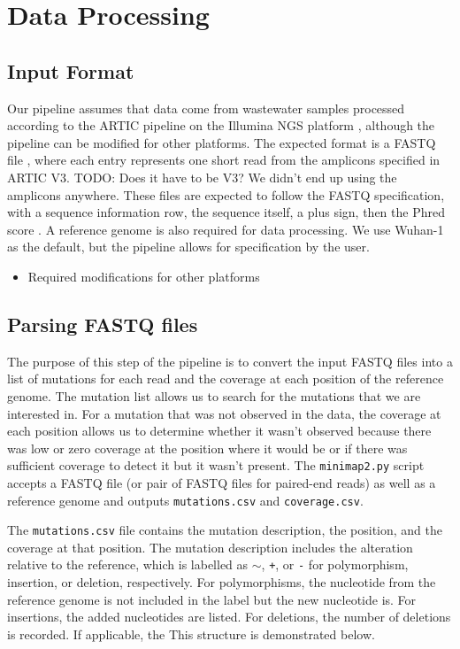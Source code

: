 \documentclass{article}
\newenvironment{tightemize}
{ \begin{itemize}
    \setlength{\itemsep}{0pt}
    \setlength{\parskip}{0pt}
    \setlength{\parsep}{0pt}     }
{ \end{itemize}                  }
\begin{document}
\section{Data Processing}

\subsection{Input Format}

Our pipeline assumes that data come from wastewater samples processed according to the ARTIC pipeline \cite{needed} on the Illumina NGS platform \cite{needed}, although the pipeline can be modified for other platforms.
The expected format is a FASTQ file \cite{needed}, where each entry represents one short read from the amplicons specified in ARTIC V3. TODO: Does it have to be V3? We didn't end up using the amplicons anywhere.
These files are expected to follow the FASTQ specification, with a sequence information row, the sequence itself, a plus sign, then the Phred score \cite{needed}.
A reference genome is also required for data processing.
We use Wuhan-1 \cite{needed} as the default, but the pipeline allows for specification by the user.



\begin{tightemize} 
    \item Required modifications for other platforms
\end{tightemize}

\subsection{Parsing FASTQ files}

The purpose of this step of the pipeline is to convert the input FASTQ files into a list of mutations for each read and the coverage at each position of the reference genome.
The mutation list allows us to search for the mutations that we are interested in.
For a mutation that was not observed in the data, the coverage at each position allows us to determine whether it wasn't observed because there was low or zero coverage at the position where it would be or if there was sufficient coverage to detect it but it wasn't present.
The \texttt{minimap2.py} script accepts a FASTQ file (or pair of FASTQ files for paired-end reads) as well as a reference genome and outputs \texttt{mutations.csv} and \texttt{coverage.csv}.

The \texttt{mutations.csv} file contains the mutation description, the position, and the coverage at that position.
The mutation description includes the alteration relative to the reference, which is labelled as \texttt{$\sim$}, \texttt{+}, or \texttt{-} for polymorphism, insertion, or deletion, respectively.
For polymorphisms, the nucleotide from the reference genome is not included in the label but the new nucleotide is.
For insertions, the added nucleotides are listed.
For deletions, the number of deletions is recorded.
If applicable, the 
This structure is demonstrated below.
\end{document}
